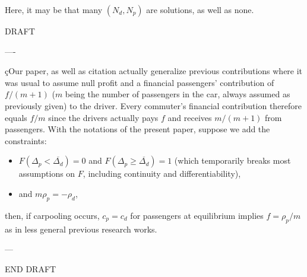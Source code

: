 \documentclass[english, a4paper]{article}
\theoremstyle{plain}
\theoremstyle{definition}
\theoremstyle{remark}
\begin{document}
Here, it may be that many $(N_d, N_p)$ are solutions, as well as none.



DRAFT

----

çOur paper, as well as \alert{citation} actually generalize previous contributions where it was usual to assume null profit and a financial passengers’ contribution of $f/(m+1)$ ($m$ being the number of passengers in the car, always assumed as previously given) to the driver. Every commuter’s financial contribution therefore equals $f/m$ since the drivers actually pays $f$ and receives $m/(m+1)$ from passengers. With the notations of the present paper, suppose we add the constraints:\begin{itemize}
    \item $F(\Delta_p < \overline{\Delta_d}) = 0$ and $F(\Delta_p \geq \overline{\Delta_d}) = 1$ (which temporarily breaks most assumptions on $F$, including continuity and differentiability),
    \item and $m \rho_p = -\rho_d$,
\end{itemize}
then, if carpooling occurs, $c_p = c_d$ for passengers at equilibrium implies $f = \rho_p / m$ as in less general previous research works.

---

END DRAFT
\end{document}
